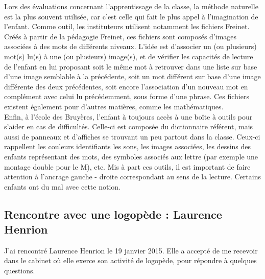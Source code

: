 Lors des évaluations concernant l'apprentissage de la classe, la méthode naturelle est la plus souvent utilisée, car c'est celle qui fait le plus appel à l'imagination de l'enfant. Comme outil, les instituteurs utilisent notamment les fichiers Freinet. Créés à partir de la pédagogie Freinet, ces fichiers sont composés d'images associées à des mots de différents niveaux. L'idée est d'associer un (ou plusieurs) mot(s) lu(s) à une (ou plusieurs) image(s), et de vérifier les capacités de lecture de l'enfant en lui proposant soit le même mot à retrouver dans une liste sur base d'une image semblable à la précédente, soit un mot différent sur base d'une image différente des deux précédentes, soit encore l'association d'un nouveau mot en complément avec celui lu précédemment, sous forme d'une phrase. Ces fichiers existent également pour d'autres matières, comme les mathématiques.\\

Enfin, à l'école des Bruyères, l'enfant à toujours accès à une boîte à outils pour s'aider en cas de difficultés. Celle-ci est composée du dictionnaire référent, mais aussi de panneaux et d'affiches se trouvant un peu partout dans la classe. Ceux-ci rappellent les couleurs identifiants les sons, les images associées, les dessins des enfants représentant des mots, des symboles associés aux lettre (par exemple une montage double pour le M), etc. Mis à part ces outils, il est important de faire attention à l'ancrage gauche - droite correspondant au sens de la lecture. Certains enfants ont du mal avec cette notion.

\subsection{Rencontre avec une logopède : Laurence Henrion}
J'ai rencontré Laurence Henrion le 19 janvier 2015. Elle a accepté de me recevoir dans le cabinet où elle exerce son activité de logopède, pour répondre à quelques questions.\\

